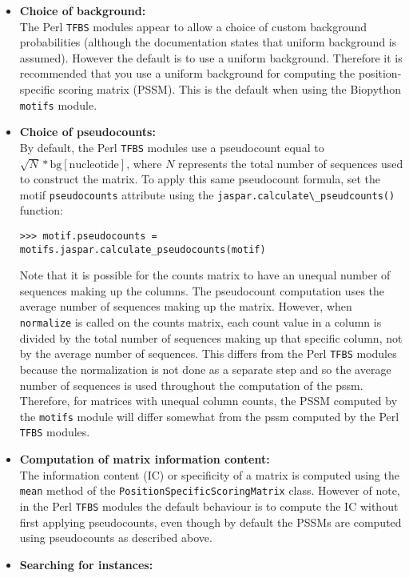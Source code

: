 \begin{itemize}
\item\textbf{Choice of background:} \\
The Perl \verb+TFBS+ modules appear to allow a choice of custom background probabilities (although the documentation states that uniform background is assumed). However the default is to use a uniform background. Therefore it is recommended that you use a uniform background for computing the position-specific scoring matrix (PSSM). This is the default when using the Biopython \verb+motifs+ module.
\item\textbf{Choice of pseudocounts:} \\
By default, the Perl \verb+TFBS+ modules use a pseudocount equal to $\sqrt{N} * \textrm{bg}[\textrm{nucleotide}]$, where $N$ represents the total number of sequences used to construct the matrix. To apply this same pseudocount formula, set the motif \verb+pseudocounts+ attribute using the \verb+jaspar.calculate\_pseudcounts()+ function:
\begin{verbatim}
>>> motif.pseudocounts = motifs.jaspar.calculate_pseudocounts(motif)
\end{verbatim}
Note that it is possible for the counts matrix to have an unequal number of sequences making up the columns. The pseudocount computation uses the average number of sequences making up the matrix. However, when \verb+normalize+ is called on the counts matrix, each count value in a column is divided by the total number of sequences making up that specific column, not by the average number of sequences. This differs from the Perl \verb+TFBS+ modules because the normalization is not done as a separate step and so the average number of sequences is used throughout the computation of the pssm. Therefore, for matrices with unequal column counts, the PSSM computed by the \verb+motifs+ module will differ somewhat from the pssm computed by the Perl \verb+TFBS+ modules.
\item\textbf{Computation of matrix information content:} \\
The information content (IC) or specificity of a matrix is computed using the \verb+mean+ method of the \verb+PositionSpecificScoringMatrix+ class. However of note, in the Perl \verb+TFBS+ modules the default behaviour is to compute the IC without first applying pseudocounts, even though by default the PSSMs are computed using pseudocounts as described above.
\item\textbf{Searching for instances:} \\

\end{itemize}
